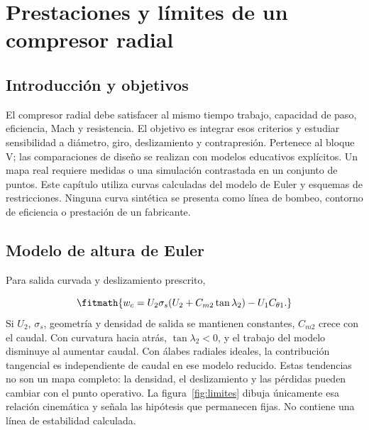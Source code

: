 \documentclass[10pt,openany]{book}
\begin{document}
\studiumchaptercheck

\chapter{Prestaciones y límites de un compresor radial}
\label{chap:c17}


\section{Introducción y objetivos}

El compresor radial debe satisfacer al mismo tiempo trabajo, capacidad de paso, eficiencia, Mach y resistencia. El objetivo es integrar esos criterios y estudiar sensibilidad a diámetro, giro, deslizamiento y contrapresión. Pertenece al bloque V; las comparaciones de diseño se realizan con modelos educativos explícitos.
Un mapa real requiere medidas o una simulación contrastada en un conjunto de puntos. Este capítulo utiliza curvas calculadas del modelo de Euler y esquemas de restricciones. Ninguna curva sintética se presenta como línea de bombeo, contorno de eficiencia o prestación de un fabricante.

\section{Modelo de altura de Euler}


Para salida curvada y deslizamiento prescrito,



\[
\fitmath{w_c=U_2\sigma_s(U_2+C_{m2}\tan\lambda_2)-U_1C_{\theta1}.}
\]
Si \(U_2\), \(\sigma_s\), geometría y densidad de salida se mantienen constantes, \(C_{m2}\) crece con el caudal. Con curvatura hacia atrás, \(\tan\lambda_2<0\), y el trabajo del modelo disminuye al aumentar caudal. Con álabes radiales ideales, la contribución tangencial es independiente de caudal en ese modelo reducido.
Estas tendencias no son un mapa completo: la densidad, el deslizamiento y las pérdidas pueden cambiar con el punto operativo. La figura~\ref{fig:limites} dibuja únicamente esa relación cinemática y señala las hipótesis que permanecen fijas. No contiene una línea de estabilidad calculada.
\end{document}
